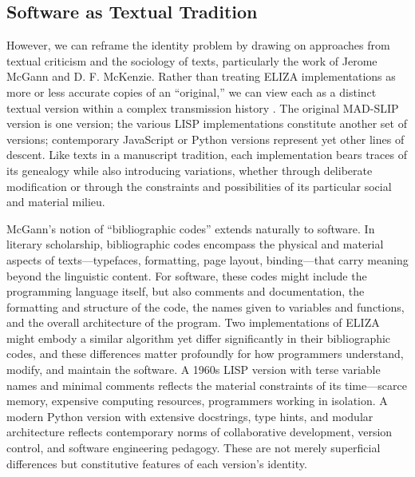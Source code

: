 \documentclass{article}
\begin{document}
\subsection{Software as Textual Tradition}

However, we can reframe the identity problem by drawing on approaches from textual criticism and the sociology of texts, particularly the work of Jerome McGann and D. F. McKenzie. Rather than treating ELIZA implementations as more or less accurate copies of an ``original,'' we can view each as a distinct textual version within a complex transmission history \cite{mcgann1991textual, mckenzie1999bibliography}. The original MAD-SLIP version is one version; the various LISP implementations constitute another set of versions; contemporary JavaScript or Python versions represent yet other lines of descent. Like texts in a manuscript tradition, each implementation bears traces of its genealogy while also introducing variations, whether through deliberate modification or through the constraints and possibilities of its particular social and material milieu.

McGann's notion of ``bibliographic codes'' \cite{mcgann1991textual} extends naturally to software. In literary scholarship, bibliographic codes encompass the physical and material aspects of texts—typefaces, formatting, page layout, binding—that carry meaning beyond the linguistic content. For software, these codes might include the programming language itself, but also comments and documentation, the formatting and structure of the code, the names given to variables and functions, and the overall architecture of the program. Two implementations of ELIZA might embody a similar algorithm yet differ significantly in their bibliographic codes, and these differences matter profoundly for how programmers understand, modify, and maintain the software. A 1960s LISP version with terse variable names and minimal comments reflects the material constraints of its time—scarce memory, expensive computing resources, programmers working in isolation. A modern Python version with extensive docstrings, type hints, and modular architecture reflects contemporary norms of collaborative development, version control, and software engineering pedagogy. These are not merely superficial differences but constitutive features of each version's identity.
\end{document}
